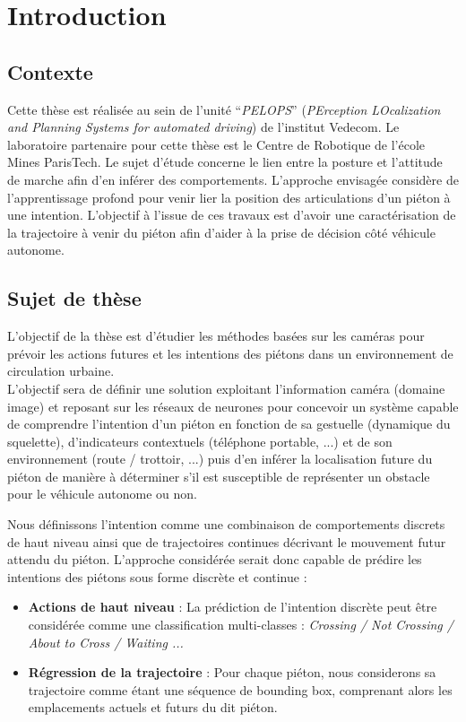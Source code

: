 \clearpage
\section{Introduction}
\label{sec:Intro}

\subsection{Contexte}
Cette thèse est réalisée au sein de l’unité “\textit{PELOPS}” (\textit{PErception LOcalization and Planning Systems for automated driving}) de l'institut Vedecom. Le laboratoire partenaire pour cette thèse est le Centre de Robotique de l'école Mines ParisTech. Le sujet d’étude concerne le lien entre la posture et l’attitude de marche afin d’en inférer des comportements. L’approche envisagée considère de l’apprentissage profond pour venir lier la position des articulations d’un piéton à une intention. L’objectif à l’issue de ces travaux est d’avoir une caractérisation de la trajectoire à venir du piéton afin d’aider à la prise de décision côté véhicule autonome.

\subsection{Sujet de thèse}
L'objectif de la thèse est d'étudier les méthodes basées sur les caméras pour prévoir les actions futures et les intentions des piétons dans un environnement de circulation urbaine.\\

L'objectif sera de définir une solution exploitant l’information caméra (domaine image) et reposant sur les réseaux de neurones pour concevoir un système capable de comprendre l’intention d’un piéton en fonction de sa gestuelle (dynamique du squelette), d'indicateurs contextuels (téléphone portable, ...) et de son environnement (route / trottoir, ...) puis d’en inférer la localisation future du piéton de manière à déterminer s’il est susceptible de représenter un obstacle pour le véhicule autonome ou non.

Nous définissons l'intention comme une combinaison de comportements discrets de haut niveau ainsi que de trajectoires continues décrivant le mouvement futur attendu du piéton. L’approche considérée serait donc capable de prédire les intentions des piétons sous forme discrète et continue : 

\begin{itemize}
    \item \textbf{Actions de haut niveau} : La prédiction de l'intention discrète peut être considérée comme une classification multi-classes : \textit{Crossing / Not Crossing / About to Cross / Waiting ...}
    \item \textbf{Régression de la trajectoire} : Pour chaque piéton, nous considerons sa trajectoire comme étant une séquence de bounding box, comprenant alors les emplacements actuels et futurs du dit piéton.
\end{itemize}

